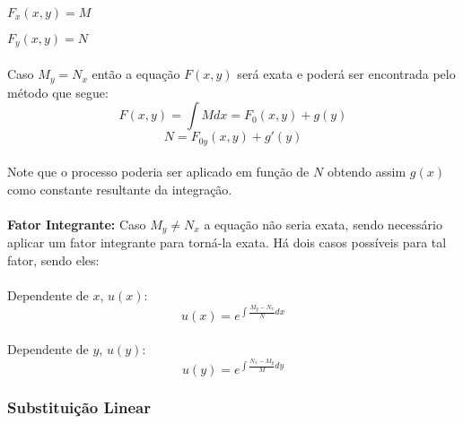 \documentclass{article}
\begin{document}
                \quad$F_{x}(x,y)=M$
                
                \quad$F_{y}(x,y)=N$
                \paragraph{}Caso $M_{y}=N_{x}$ então a equação $F(x,y)$ será exata e poderá ser encontrada pelo método que segue:
                    \begin{equation}
                        F(x,y)=\int{M}dx=F_{0}(x,y)+g(y)
                    \end{equation}
                    \begin{equation}
                        N= F_{0y}(x,y)+g'(y)
                    \end{equation}
                \paragraph{}Note que o processo poderia ser aplicado em função de $N$ obtendo assim $g(x)$ como constante resultante da integração.
                \paragraph{}\textbf{Fator Integrante:} Caso $M_{y}\neq N_{x}$ a equação não seria exata, sendo necessário aplicar um fator integrante para torná-la exata. Há dois casos possíveis para tal fator, sendo eles:
                
                \paragraph{}Dependente de $x$, $u(x)$:
                    \begin{equation}
                        u(x)=e^{\int{\frac{M_{y}-N_{x}}{N}dx}}
                    \end{equation}
                \paragraph{}Dependente de $y$, $u(y)$:
                    \begin{equation}
                        u(y)=e^{\int{\frac{N_{x}-M_{y}}{M}dy}}
                    \end{equation}

            \subsubsection{Substituição Linear}
\end{document}
